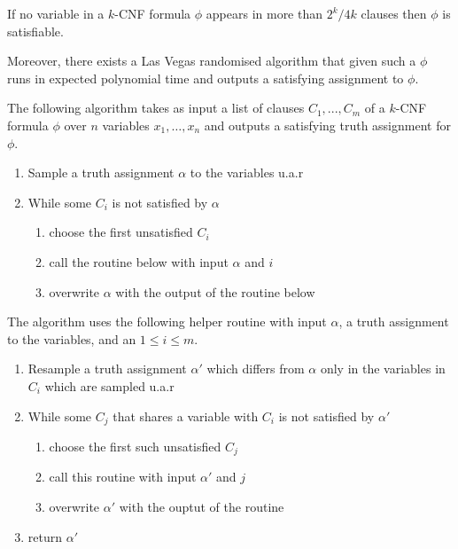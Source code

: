 \documentclass{article}
\begin{document}
\begin{theorem}[Moser]
  If no variable in a $k$-CNF formula $\phi$ appears in more than $2^k/4k$ clauses then
  $\phi$ is satisfiable.

  Moreover, there exists a Las Vegas randomised algorithm that given such a $\phi$ runs in
  expected polynomial time and outputs a satisfying assignment to $\phi$.
\end{theorem}

\begin{algorithm}
  The following algorithm takes as input a list of clauses $C_1,...,C_m$ of a $k$-CNF
  formula $\phi$ over $n$ variables $x_1,\ldots,x_n$ and outputs a satisfying truth
  assignment for $\phi$.

  \begin{enumerate}
    \item Sample a truth assignment $\alpha$ to the variables u.a.r
    \item While some $C_i$ is not satisfied by $\alpha$
      \begin{enumerate}
        \item choose the first unsatisfied $C_i$
        \item call the routine below with input $\alpha$ and $i$
        \item overwrite $\alpha$ with the output of the routine below
      \end{enumerate}
  \end{enumerate}
  The algorithm uses the following helper routine with input $\alpha$, a truth assignment
  to the variables, and an $1\leq i\leq m$.
  \begin{enumerate}
    \item Resample a truth assignment $\alpha'$ which differs from $\alpha$ only in the variables
      in $C_i$ which are sampled u.a.r
    \item While some $C_j$ that shares a variable with $C_i$ is not satisfied by $\alpha'$
      \begin{enumerate}
        \item choose the first such unsatisfied $C_j$
        \item call this routine with input $\alpha'$ and $j$
        \item overwrite $\alpha'$ with the ouptut of the routine
      \end{enumerate}
    \item return $\alpha'$
  \end{enumerate}
\end{algorithm}
\end{document}
